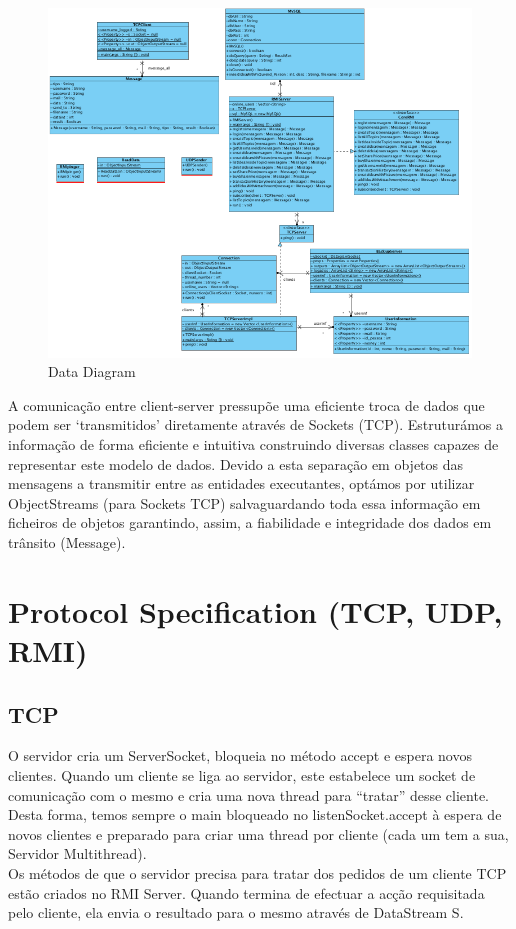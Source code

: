\documentclass[12pt]{article} %
\begin{document}
\begin{figure}[!ht]
  	\centering
  	\includegraphics[scale=0.6]{ClassDiagram.png}
  	\caption{Data Diagram}
	\label{figure4}
\end{figure}

A comunicação entre client-server pressupõe uma eficiente troca de dados que podem ser ‘transmitidos’ diretamente através de Sockets (TCP). 
Estruturámos a informação de forma eficiente e intuitiva construindo diversas classes capazes de representar este modelo de dados. Devido a esta separação em objetos das mensagens a transmitir entre as entidades executantes, optámos por utilizar ObjectStreams (para Sockets TCP) salvaguardando toda essa informação em ficheiros de objetos garantindo, assim, a fiabilidade e integridade dos dados em trânsito (Message).





\section{Protocol Specification (TCP, UDP, RMI)} %
\label{sec:protocal_specs}

\subsection{TCP}
O servidor cria um ServerSocket, bloqueia no método accept e espera novos clientes. Quando um cliente se liga ao servidor, este estabelece um socket de comunicação com o mesmo e cria uma nova thread para “tratar” desse cliente. Desta forma, temos sempre o main bloqueado no listenSocket.accept à espera de novos clientes e preparado para criar uma thread por cliente (cada um tem a sua, Servidor Multithread).\\
Os métodos de que o servidor precisa para tratar dos pedidos de um cliente TCP estão criados no RMI Server. Quando termina de efectuar a acção requisitada pelo cliente, ela envia o resultado para o mesmo através de DataStream S.
\end{document}
